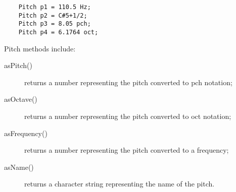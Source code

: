 \begin{verbatim}
    Pitch p1 = 110.5 Hz;
    Pitch p2 = C#5+1/2;
    Pitch p3 = 8.05 pch;
    Pitch p4 = 6.1764 oct;
\end{verbatim}

Pitch methods include:

\begin{description}
\item[asPitch()]
returns a number representing the pitch converted to pch notation;
\item[asOctave()]
returns a number representing the pitch converted to oct notation;
\item[asFrequency()]
returns a number representing the pitch converted to a frequency;
\item[asName()]
returns a character string representing the name of the pitch.
\end{description}
